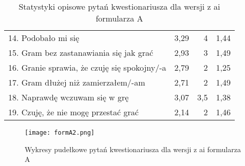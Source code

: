 \begin{table}[h!]
\begin{center}
\begin{tabular}{|m{10em}|r|r|r|}
            14. Podobało mi się                                               & 3,29          & 4       & 1,44           \\
            15. Gram bez zastanawiania się jak grać                           & 2,93          & 3       & 1,49           \\
            16. Granie sprawia, \newline że czuję się spokojny/-a             & 2,79          & 2       & 1,25           \\
            17. Gram dłużej \newline niż zamierzałem/-am                      & 2,71          & 2       & 1,49           \\
            18. Naprawdę wczuwam się w grę                                    & 3,07          & 3,5     & 1,38           \\
            19. Czuję, że nie mogę przestać grać                              & 2,14          & 2       & 1,46           \\
            \hline
        \end{tabular}
    \end{center}
    \caption{Statystyki opisowe pytań kwestionariusza dla wersji z \gls{ai} formularza A}\label{tab1:appendixB_8}
\end{table}

\begin{figure}[h!]
    \centering
    \texttt{[image: formA2.png]}
    \caption{Wykresy pudełkowe pytań kwestionariusza dla wersji z \gls{ai} formularza A}
    \label{fig:appendixB_formA2}
\end{figure}

